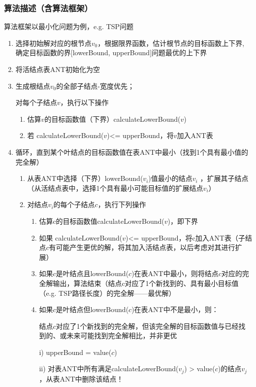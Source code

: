 \documentclass[lang=cn,11pt,a4paper]{elegantpaper}
\begin{document}
\subsubsection{算法描述（含算法框架）}
算法框架以最小化问题为例，e.g. TSP问题
\begin{enumerate}
    \item 选择初始解对应的根节点$v_0$，根据限界函数，估计根节点的目标函数上下界, 确定目标函数的界[lowerBound, upperBound]问题最优的上下界
    \item 将活结点表ANT初始化为空
    \item 生成根结点$v_0$的全部子结点-宽度优先；

    对每个子结点$v$，执行以下操作
    
    \begin{enumerate}
        \item 估算$v$的目标函数值（下界）calculateLowerBound($v$)
        \item 若 calculateLowerBound($v$)<= upperBound，将$v$加入ANT表
    \end{enumerate}
    \item 循环，直到某个叶结点的目标函数值在表ANT中最小（找到1个具有最小值的完全解）
    \begin{enumerate}
        \item 从表ANT中选择（下界）lowerBound($v_i$)值最小的结点$v_i$ ，扩展其子结点（从活结点表中，选择1个具有最小可能目标值的扩展结点$v_i$）
        \item 对结点$v_i$的每个子结点$c$，执行下列操作
        \begin{enumerate}
            \item 估算c的目标函数值calculateLowerBound($v$)，即下界
            \item 如果 calculateLowerBound($v$)<= upperBound，将c加入ANT表（子结点$c$有可能产生更优的解，将其加入活结点表，以后考虑对其进行扩展）
            \item 如果$c$是叶结点且lowerBound($c$)在表ANT中最小，则将结点$c$对应的完全解输出，算法结束（结点c对应了1个新找到的、具有最小目标值（e.g. TSP路径长度）的完全解——最优解）
            \item 如果$c$是叶结点但lowerBound($c$)在表ANT中不是最小，则：
            
            结点$c$对应了1个新找到的完全解，但该完全解的目标函数值与已经找到的、或未来可能找到完全解相比，并非更优
            
            i) upperBound = value($c$)
            
            ii) 对表ANT中所有满足calculateLowerBound($v_j$) > value($c$)的结点$v_j$，从表ANT中删除该结点！
        \end{enumerate}
    \end{enumerate}
\end{enumerate}
     
\end{document}
